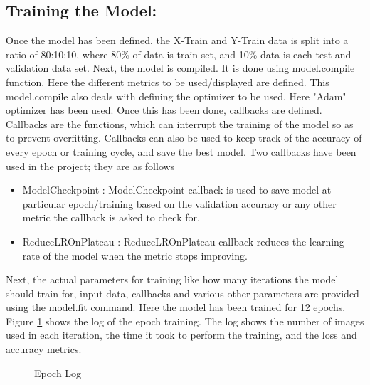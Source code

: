 \subsection{Training the Model:}
Once the model has been defined, the X-Train and Y-Train data is split into a ratio of 80:10:10, where 80\% of data is train set, and 10\% data is each test and validation data set. Next, the model is compiled. It is done using model.compile function. Here the different metrics to be used/displayed are defined. This model.compile also deals with defining the optimizer to be used. Here "Adam" optimizer has been used. Once this has been done, callbacks are defined. Callbacks are the functions, which can interrupt the training of the model so as to prevent overfitting. Callbacks can also be used to keep track of the accuracy of every epoch or training cycle, and save the best model. Two callbacks have been used in the project; they are as follows
\begin{itemize}
    \item ModelCheckpoint : ModelCheckpoint callback is used to save model at particular epoch/training based on the validation accuracy or any other metric the callback is asked to check for. 
    \item ReduceLROnPlateau : ReduceLROnPlateau callback reduces the learning rate of the model when the metric stops improving.
\end{itemize}
Next, the actual parameters for training like how many iterations the model should train for, input data, callbacks and various other parameters are provided using the model.fit command. Here the model has been trained for 12 epochs. Figure \ref{fig:epoch} shows the log of the epoch training. The log shows the number of images used in each iteration, the time it took to perform the training, and the loss and accuracy metrics. 
\begin{figure}[H]
\caption{Epoch Log} \label{fig:epoch}
\end{figure}

